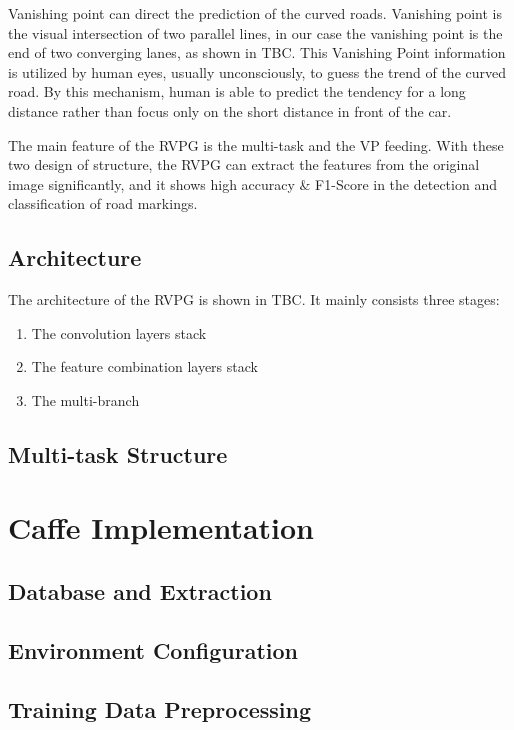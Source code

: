 \begin{spacing}{1.5}
Vanishing point can direct the prediction of the curved roads. Vanishing point is the visual intersection of two parallel lines, in our case the vanishing point is the end of two converging lanes, as shown in TBC. This Vanishing Point information is utilized by human eyes, usually unconsciously, to guess the trend of the curved road. By this mechanism, human is able to predict the tendency for a long distance rather than focus only on the short distance in front of the car.

The main feature of the RVPG is the multi-task and the VP feeding. With these two design of structure, the RVPG can extract the features from the original image significantly, and it shows high accuracy \& F1-Score in the detection and classification of road markings.

\subsection{Architecture}

The architecture of the RVPG is shown in TBC. It mainly consists three stages:

\begin{enumerate}
    \item The convolution layers stack
    \item The feature combination layers stack
    \item The multi-branch
\end{enumerate}

\subsection{Multi-task Structure}


\section{Caffe Implementation}
\label{sec:MD_CAFFE}

\subsection{Database and Extraction}

\subsection{Environment Configuration}

\subsection{Training Data Preprocessing}


\end{spacing}
